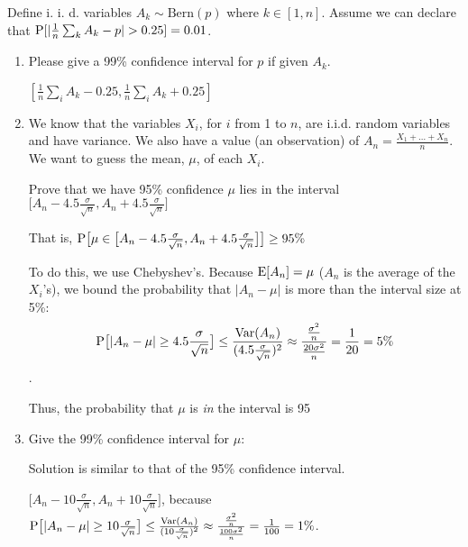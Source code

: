 \question Define i. i. d. variables ${A_k}\sim \text{Bern}(p)$ where 
$k \in [1, n]$. Assume we can declare that $\P[|\frac{1}{n}\sum_{k} 
A_k - p| > 0.25] = 0.01$.
\begin{enumerate}[label=(\alph*)]
\item  Please give a 99\% confidence interval  for $p$ if given $A_k$.
\begin{solution}[3cm]
$[\frac{1}{n} \sum_{i} A_k - 0.25, \frac{1}{n} \sum_{i} A_k + 0.25]$
\end{solution}

\item We know that the variables $X_i$, for $i$ from 1 to $n$, are i.i.d. 
random variables and have variance. We also have a value (an observation) 
of $A_n = \frac{X_1 + \ldots + X_n}{n}$. We want to guess the mean, $\mu$, 
of each $X_i$.

Prove that we have 95\% confidence $\mu$ lies in the interval
$\big[ A_n - 4.5\frac{\sigma}{\sqrt{n}}, A_n + 4.5\frac{\sigma}{\sqrt{n}} \big]$

That is,
$\P \big[ \mu \in \big[ A_n - 4.5\frac{\sigma}{\sqrt{n}}, A_n + 
4.5\frac{\sigma}{\sqrt{n}} \big] \big] \ge 95\%$
\begin{solution} [3cm]
To do this, we use Chebyshev's. Because $\E[A_n] = \mu$ ($A_n$  is the 
average of the $X_i$’s), we bound the probability that $|A_n - \mu|$ 
is more than the interval size at 5\%:\newline
\[\P\big[ |A_n - \mu| \ge 4.5\frac{\sigma}{\sqrt{n}} \big] \le 
\frac{\text{Var}(A_n)}{(4.5 \frac{\sigma}{\sqrt{n}})^2} \approx 
\frac{\frac{\sigma^2}{n}}{\frac{20\sigma^2}{n}} = \frac{1}{20} = 5\%\].

Thus, the probability that $\mu$ is \textit{in} the interval is 95%
\end{solution}

\item Give the 99\% confidence interval for $\mu$:
\begin{solution}[3cm]
Solution is similar to that of the 95\% confidence interval. 

$\big[ A_n - 10\frac{\sigma}{\sqrt{n}}, A_n + 10\frac{\sigma}{\sqrt{n}} 
\big]$, because
$\P\big[ |A_n - \mu| \ge 10\frac{\sigma}{\sqrt{n}} \big] \le 
\frac{\text{Var}(A_n)}{(10 \frac{\sigma}{\sqrt{n}})^2} \approx 
\frac{\frac{\sigma^2}{n}}{\frac{100\sigma^2}{n}} = \frac{1}{100} = 1\%$.
\end{solution}
\end{enumerate}